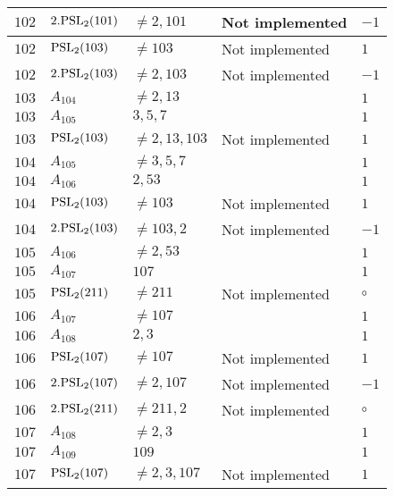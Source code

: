\documentclass[a4paper, 11pt]{article}
\begin{document}
\begin{longtable}{lllll}
        $ 102 $ & $ 2.{\rm PSL}_{2}(101) $ & $ \neq 2, 101 $ & Not implemented & $ -1  $ \\ \hline
        $ 102 $ & $ {\rm PSL}_{2}(103) $ & $ \neq 103 $ & Not implemented & $ 1  $ \\ \hline
        $ 102 $ & $ 2.{\rm PSL}_{2}(103) $ & $ \neq 2, 103 $ & Not implemented & $ -1  $ \\ \hline
        $ 103 $ & $ A_{104} $ & $ \neq 2, 13 $ & $ ~ $ & $ 1  $ \\ \hline
        $ 103 $ & $ A_{105} $ & $ 3, 5, 7 $ & $ ~ $ & $ 1  $ \\ \hline
        $ 103 $ & $ {\rm PSL}_{2}(103) $ & $ \neq 2, 13, 103 $ & Not implemented & $ 1  $ \\ \hline
        $ 104 $ & $ A_{105} $ & $ \neq 3, 5, 7 $ & $ ~ $ & $ 1  $ \\ \hline
        $ 104 $ & $ A_{106} $ & $ 2, 53 $ & $ ~ $ & $ 1  $ \\ \hline
        $ 104 $ & $ {\rm PSL}_{2}(103) $ & $ \neq 103 $ & Not implemented & $ 1  $ \\ \hline
        $ 104 $ & $ 2.{\rm PSL}_{2}(103) $ & $ \neq 103, 2 $ & Not implemented & $ -1  $ \\ \hline
        $ 105 $ & $ A_{106} $ & $ \neq 2, 53 $ & $ ~ $ & $ 1  $ \\ \hline
        $ 105 $ & $ A_{107} $ & $ 107 $ & $ ~ $ & $ 1  $ \\ \hline
        $ 105 $ & $ {\rm PSL}_{2}(211) $ & $ \neq 211 $ & Not implemented & $\circ$ \\ \hline
        $ 106 $ & $ A_{107} $ & $ \neq 107 $ & $ ~ $ & $ 1  $ \\ \hline
        $ 106 $ & $ A_{108} $ & $ 2, 3 $ & $ ~ $ & $ 1  $ \\ \hline
        $ 106 $ & $ {\rm PSL}_{2}(107) $ & $ \neq 107 $ & Not implemented & $ 1  $ \\ \hline
        $ 106 $ & $ 2.{\rm PSL}_{2}(107) $ & $ \neq 2, 107 $ & Not implemented & $ -1  $ \\ \hline
        $ 106 $ & $ 2.{\rm PSL}_{2}(211) $ & $ \neq 211, 2 $ & Not implemented & $\circ$ \\ \hline
        $ 107 $ & $ A_{108} $ & $ \neq 2, 3 $ & $ ~ $ & $ 1  $ \\ \hline
        $ 107 $ & $ A_{109} $ & $ 109 $ & $ ~ $ & $ 1  $ \\ \hline
        $ 107 $ & $ {\rm PSL}_{2}(107) $ & $ \neq 2, 3, 107 $ & Not implemented & $ 1  $ \\ \hline

\end{longtable}
\end{document}
